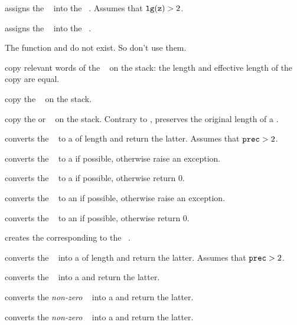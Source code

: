  assigns the ~ into the
~. Assumes that ${\tt lg(z)} > 2$.

 assigns the ~ into the
~.

\noindent The function  and  do not exist. So don't use
them.


 copy relevant words of the ~ on the
stack: the length and effective length of the copy are equal.

 copy the ~ on the stack.

 copy the  or ~ on the
stack. Contrary to ,  preserves the original length
of a .


 converts the ~ to a
 of length  and return the latter.
Assumes that ${\tt prec} > 2$.

 converts the ~ to a  if
possible, otherwise raise an exception.

 converts the ~ to a  if
possible, otherwise return $0$.

 converts the ~ to an  if
possible, otherwise raise an exception.

 converts the ~ to an
 if possible, otherwise return $0$.

 creates the  corresponding to the
~.

 converts the ~ into a
 of length  and return the latter. Assumes that
${\tt prec} > 2$.

 converts the ~ into a 
and return the latter.

 converts the \emph{non-zero} ~
into a  and return the latter.

 converts the \emph{non-zero} ~
into a  and return the latter.

